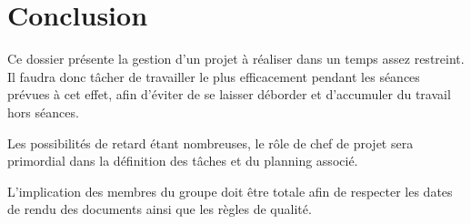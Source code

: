 \section{Conclusion}
Ce dossier présente la gestion d'un projet à réaliser dans un temps assez restreint. Il faudra donc tâcher de travailler le plus efficacement pendant les séances prévues à cet effet, afin d'éviter de se laisser déborder et d'accumuler du travail hors séances.

Les possibilités de retard étant nombreuses, le rôle de chef de projet sera primordial dans la définition des tâches et du planning associé.

L'implication des membres du groupe doit être totale afin de respecter les dates de rendu des documents ainsi que les règles de qualité.

